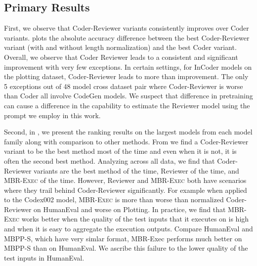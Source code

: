 \documentclass[nohyperref]{article}
\theoremstyle{plain}
\theoremstyle{definition}
\theoremstyle{remark}
\begin{document}
\subsection{Primary Results}
\label{sec:main-results}


First, we observe that Coder-Reviewer variants consistently improves over Coder variants. 
 plots the absolute accuracy difference between the best Coder-Reviewer variant (with and without length normalization) and the best Coder variant.
Overall, we observe that Coder Reviewer leads to a consistent and significant improvement with very few exceptions.
In certain settings, \eg for InCoder models on the plotting dataset, Coder-Reviewer leads to more than  improvement.
The only 5 exceptions out of 48 model cross dataset pair where Coder-Reviewer is worse than Coder all involve CodeGen models.
We suspect that difference in pretraining can cause a difference in the capability to estimate the Reviewer model  using the prompt we employ in this work.

Second, in , we present the ranking results on the largest models from each model family along with comparison to other methods.
From  we find a Coder-Reviewer variant to be the best method most of the time and even when it is not, it is often the second best method.
Analyzing across all data, we find that Coder-Reviewer variants are the best method  of the time, Reviewer  of the time, and MBR-\textsc{Exec}  of the time.
However, Reviewer and MBR-\textsc{Exec} both have scenarios where they trail behind Coder-Reviewer significantly.
For example when applied to the Codex002 model, MBR-\textsc{Exec} is more than  worse than normalized Coder-Reviewer on HumanEval and  worse on Plotting.
In practice, we find that MBR-\textsc{Exec} works better when the quality of the test inputs that it executes on is high and when it is easy to aggregate the execution outputs.
Compare HumanEval and MBPP-S, which have very simlar format, MBR-Exec performs much better on MBPP-S than on HumanEval.
We ascribe this failure to the lower quality of the test inputs in HumanEval.
\end{document}
